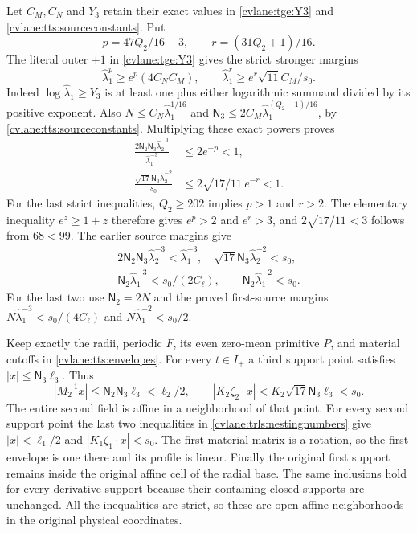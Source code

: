 Let $C_M,C_N$ and $Y_3$ retain their exact values in
\eqref{cvlane:tge:Y3} and \eqref{cvlane:tts:sourceconstants}. Put
\[
 p=47Q_2/16-3,\qquad r=(31Q_2+1)/16.
\]
The literal outer $+1$ in \eqref{cvlane:tge:Y3} gives the strict
stronger margins
\begin{equation}\label{cvlane:trls:sourcemargins}
 \widehat\lambda_1^p\geq e^p(4C_NC_M),\qquad
 \widehat\lambda_1^r\geq e^r\sqrt{11}C_M/s_0.
\end{equation}
Indeed $\log\widehat\lambda_1\geq Y_3$ is at least one
plus either logarithmic summand divided by its positive exponent.
Also $N\leq C_N\widehat\lambda_1^{1/16}$ and
$\mathsf N_3\leq2C_M
\widehat\lambda_1^{(Q_2-1)/16}$, by
\eqref{cvlane:tts:sourceconstants}. Multiplying these exact powers
proves
\begin{align*}
 \frac{2\mathsf N_2\mathsf N_3
                  \widehat\lambda_2^{-3}}
      {\widehat\lambda_1^{-3}}&\leq2e^{-p}<1,\\
 \frac{\sqrt{17}\mathsf N_3
                  \widehat\lambda_2^{-2}}{s_0}
     &\leq2\sqrt{17/11}\,e^{-r}<1.
\end{align*}
For the last strict inequalities, $Q_2\geq202$ implies
$p>1$ and $r>2$. The elementary inequality $e^z\geq1+z$
therefore gives $e^p>2$ and $e^r>3$, and
$2\sqrt{17/11}<3$ follows from $68<99$.
The earlier source margins give
\begin{equation}\label{cvlane:trls:nestingnumbers}
 \begin{gathered}
 2\mathsf N_2\mathsf N_3\widehat\lambda_2^{-3}
      <\widehat\lambda_1^{-3},\quad
 \sqrt{17}\mathsf N_3\widehat\lambda_2^{-2}<s_0,\\
 \mathsf N_2\widehat\lambda_1^{-3}<s_0/(2C_\ell),
 \qquad \mathsf N_2\widehat\lambda_1^{-2}<s_0.
 \end{gathered}
\end{equation}
For the last two use $\mathsf N_2=2N$ and the proved
first-source margins $N\widehat\lambda_1^{-3}
<s_0/(4C_\ell)$ and $N\widehat\lambda_1^{-2}<s_0/2$.

Keep exactly the radii, periodic $F$, its even zero-mean primitive
$P$, and material cutoffs in \eqref{cvlane:tts:envelopes}.
For every $t\in I_+$ a third support point satisfies
$|x|\leq\mathsf N_3\ell_3$. Thus
\[
 |M_2^{-1}x|\leq\mathsf N_2\mathsf N_3\ell_3<\ell_2/2,
 \qquad |K_2\zeta_2\cdot x|
    <K_2\sqrt{17}\mathsf N_3\ell_3<s_0.
\]
The entire second field is affine in a neighborhood of that point.
For every second support point the last two inequalities in
\eqref{cvlane:trls:nestingnumbers} give $|x|<\ell_1/2$ and
$|K_1\zeta_1\cdot x|<s_0$. The first material matrix is
a rotation, so the first envelope is one there and its profile
is linear. Finally the original first support remains inside the
original affine cell of the radial base. The same inclusions hold
for every derivative support because their containing closed supports
are unchanged. All the inequalities are strict, so these are open
affine neighborhoods in the original physical coordinates.

